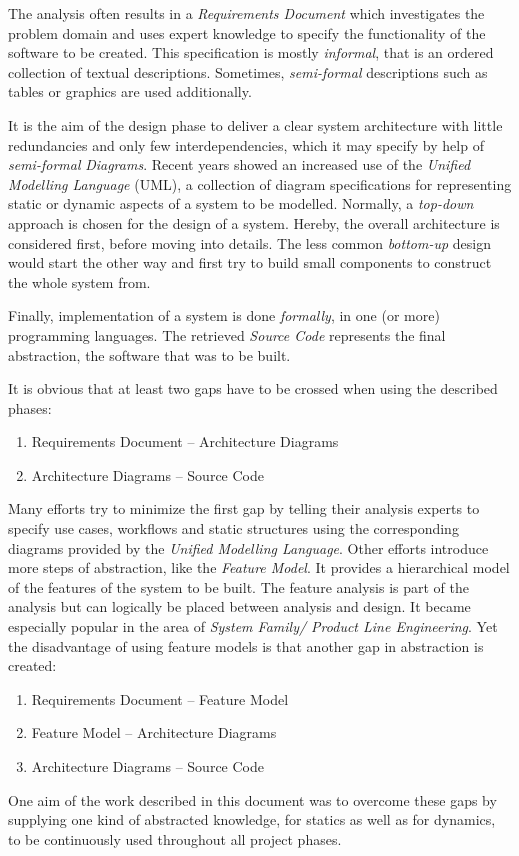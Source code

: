 The analysis often results in a \emph{Requirements Document} which investigates
the problem domain and uses expert knowledge to specify the functionality of the
software to be created. This specification is mostly \emph{informal}, that is an
ordered collection of textual descriptions. Sometimes, \emph{semi-formal}
descriptions such as tables or graphics are used additionally.

It is the aim of the design phase to deliver a clear system architecture with
little redundancies and only few interdependencies, which it may specify by help
of \emph{semi-formal} \emph{Diagrams}. Recent years showed an increased use of the
\emph{Unified Modelling Language} (UML), a collection of diagram specifications
for representing static or dynamic aspects of a system to be modelled.
Normally, a \emph{top-down} approach is chosen for the design of a system.
Hereby, the overall architecture is considered first, before moving into details.
The less common \emph{bottom-up} design would start the other way and first try
to build small components to construct the whole system from.

Finally, implementation of a system is done \emph{formally}, in one (or more)
programming languages. The retrieved \emph{Source Code} represents the final
abstraction, the software that was to be built.

It is obvious that at least two gaps have to be crossed when using the described
phases:

\begin{enumerate}
    \item{Requirements Document -- Architecture Diagrams}
    \item{Architecture Diagrams -- Source Code}
\end{enumerate}

Many efforts try to minimize the first gap by telling their analysis experts
to specify use cases, workflows and static structures using the corresponding
diagrams provided by the \emph{Unified Modelling Language}.
Other efforts introduce more steps of abstraction, like the \emph{Feature Model}.
It provides a hierarchical model of the features of the system to be built.
The feature analysis is part of the analysis but can logically be placed between
analysis and design. It became especially popular in the area of
\emph{System Family/ Product Line Engineering}. Yet the disadvantage of using
feature models is that another gap in abstraction is created:

\begin{enumerate}
    \item{Requirements Document -- Feature Model}
    \item{Feature Model -- Architecture Diagrams}
    \item{Architecture Diagrams -- Source Code}
\end{enumerate}

One aim of the work described in this document was to overcome these gaps by
supplying one kind of abstracted knowledge, for statics as well as for dynamics,
to be continuously used throughout all project phases.
